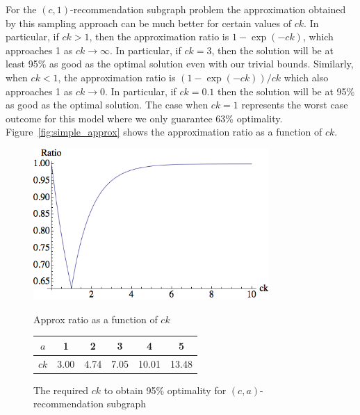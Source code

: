 For the $(c, 1)$-recommendation subgraph problem the approximation obtained by this sampling
approach can be much better for certain values of $ck$. In particular,
if $ck>1$, then the approximation ratio is $1-\exp(-ck)$, which
approaches 1 as $ck\to\infty$. In particular, if $ck=3$, then the
solution will be at least 95\% as good as the optimal solution even
with our trivial bounds. Similarly, when $ck<1$, the approximation
ratio is $(1-\exp(-ck))/ck$ which also approaches 1 as $ck\to 0$. In
particular, if $ck=0.1$ then the solution will be at 95\% as good as
the optimal solution. The case when $ck=1$ represents the
worst case outcome for this model where we only guarantee 63\%
optimality. Figure~\ref{fig:simple_approx} shows the approximation ratio as a
function of $ck$.\vs

\begin{figure}[b]
\centering
\begin{minipage}[h]{0.45\textwidth}
  \centering
  \includegraphics[width=0.8\textwidth]{images/sri_Original.png}
  \caption{Approx ratio as a function of $ck$ }\label{fig:simple_approx}
\end{minipage}
\hspace{0cm}
\begin{minipage}[t]{0.45\textwidth}
  \centering
  \begin{tabular}{ |c|c|c|c|c|c| }
    \hline
    $a$ & 1 & 2 & 3 & 4 & 5 \\ \hline
    $ck$ & 3.00 & 4.74 & 7.05 & 10.01 & 13.48 \\
    \hline
  \end{tabular}
  \vspace{0.7cm}
  \caption{The required $ck$ to obtain 95\% optimality for $(c, a)$-recommendation subgraph}
  \label{a-values}
\end{minipage}
\end{figure}



